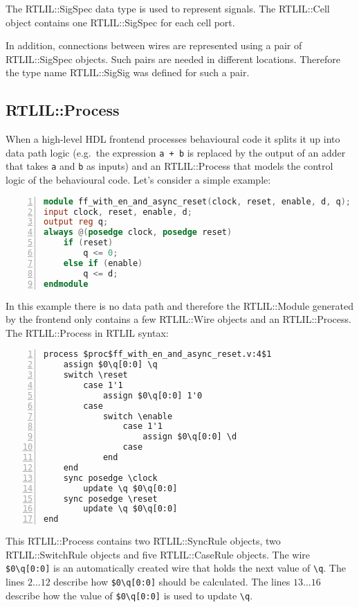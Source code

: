 The RTLIL::SigSpec data type is used to represent signals. The RTLIL::Cell
object contains one RTLIL::SigSpec for each cell port.

In addition, connections between wires are represented using a pair of
RTLIL::SigSpec objects. Such pairs are needed in different locations. Therefore
the type name RTLIL::SigSig was defined for such a pair.

\subsection{RTLIL::Process}

When a high-level HDL frontend processes behavioural code it splits it up into
data path logic (e.g.~the expression {\tt a + b} is replaced by the output of an
adder that takes {\tt a} and {\tt b} as inputs) and an RTLIL::Process that models
the control logic of the behavioural code. Let's consider a simple example:

\begin{lstlisting}[numbers=left,frame=single,language=Verilog]
module ff_with_en_and_async_reset(clock, reset, enable, d, q);
input clock, reset, enable, d;
output reg q;
always @(posedge clock, posedge reset)
	if (reset)
		q <= 0;
	else if (enable)
		q <= d;
endmodule
\end{lstlisting}

In this example there is no data path and therefore the RTLIL::Module generated by
the frontend only contains a few RTLIL::Wire objects and an RTLIL::Process.
The RTLIL::Process in RTLIL syntax:

\begin{lstlisting}[numbers=left,frame=single,language=rtlil]
process $proc$ff_with_en_and_async_reset.v:4$1
	assign $0\q[0:0] \q
	switch \reset
		case 1'1
			assign $0\q[0:0] 1'0
		case
			switch \enable
				case 1'1
					assign $0\q[0:0] \d
				case
			end
	end
	sync posedge \clock
		update \q $0\q[0:0]
	sync posedge \reset
		update \q $0\q[0:0]
end
\end{lstlisting}

This RTLIL::Process contains two RTLIL::SyncRule objects, two RTLIL::SwitchRule
objects and five RTLIL::CaseRule objects. The wire {\tt \$0\textbackslash{}q[0:0]}
is an automatically created wire that holds the next value of {\tt \textbackslash{}q}. The lines
$2 \dots 12$ describe how {\tt \$0\textbackslash{}q[0:0]} should be calculated. The
lines $13 \dots 16$ describe how the value of {\tt \$0\textbackslash{}q[0:0]} is used
to update {\tt \textbackslash{}q}.

